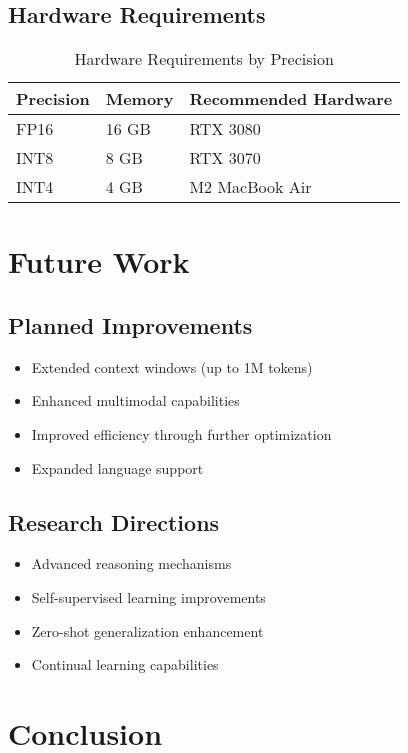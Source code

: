 \documentclass[11pt,a4paper]{article}
\begin{document}
\subsection{Hardware Requirements}
\begin{table}[H]
\centering
\begin{tabular}{lll}
\toprule
\textbf{Precision} & \textbf{Memory} & \textbf{Recommended Hardware} \\
\midrule
FP16 & 16 GB & RTX 3080 \\
INT8 & 8 GB & RTX 3070 \\
INT4 & 4 GB & M2 MacBook Air \\
\bottomrule
\end{tabular}
\caption{Hardware Requirements by Precision}
\end{table}

\section{Future Work}

\subsection{Planned Improvements}
\begin{itemize}
    \item Extended context windows (up to 1M tokens)
    \item Enhanced multimodal capabilities
    \item Improved efficiency through further optimization
    \item Expanded language support
\end{itemize}

\subsection{Research Directions}
\begin{itemize}
    \item Advanced reasoning mechanisms
    \item Self-supervised learning improvements
    \item Zero-shot generalization enhancement
    \item Continual learning capabilities
\end{itemize}

\section{Conclusion}
\end{document}
